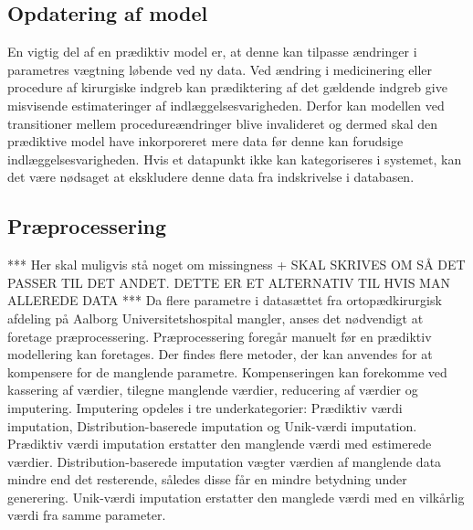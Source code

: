 \subsection{Opdatering af model}
En vigtig del af en prædiktiv model er, at denne kan tilpasse ændringer i parametres vægtning løbende ved ny data.\cite{Kuhn2013} Ved ændring i medicinering eller procedure af kirurgiske indgreb kan prædiktering af det gældende indgreb give misvisende estimateringer af indlæggelsesvarigheden. Derfor kan modellen ved transitioner mellem procedureændringer blive invalideret og dermed skal den prædiktive model have inkorporeret mere data før denne kan forudsige indlæggelsesvarigheden. 
Hvis et datapunkt ikke kan kategoriseres i systemet, kan det være nødsaget at ekskludere denne data fra indskrivelse i databasen.


\subsection{Præprocessering}
*** Her skal muligvis stå noget om missingness + SKAL SKRIVES OM SÅ DET PASSER TIL DET ANDET. DETTE ER ET ALTERNATIV TIL HVIS MAN ALLEREDE DATA ***
Da flere parametre i datasættet fra ortopædkirurgisk afdeling på Aalborg Universitetshospital mangler, anses det nødvendigt at foretage præprocessering. Præprocessering foregår manuelt før en prædiktiv modellering kan foretages.
Der findes flere metoder, der kan anvendes for at kompensere for de manglende parametre. Kompenseringen kan forekomme ved kassering af værdier, tilegne manglende værdier, reducering af værdier og imputering. Imputering opdeles i tre underkategorier: Prædiktiv værdi imputation, Distribution-baserede imputation og Unik-værdi imputation. Prædiktiv værdi imputation erstatter den manglende værdi med estimerede værdier. Distribution-baserede imputation vægter værdien af manglende data mindre end det resterende, således disse får en mindre betydning under generering. Unik-værdi imputation  erstatter den manglede værdi med en vilkårlig værdi fra samme parameter.\cite{Saar2007} 